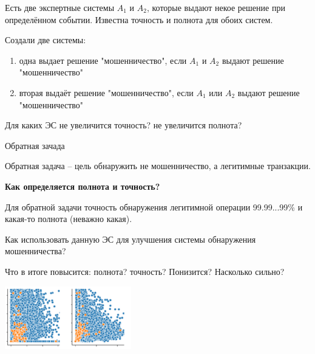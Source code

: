   
\begin{frame}
	Есть две экспертные системы $A_1$ и $A_2$, которые выдают некое решение при определённом событии. 
	Известна точность и полнота для обоих систем.
	
	Создали две системы: 
	\begin{enumerate}
		\item одна выдает решение "мошенничество", если $A_1$ и $A_2$ выдают решение "мошенничество"
		\item вторая выдаёт решение "мошенничество", если $A_1$ или $A_2$ выдают решение "мошенничество"
	\end{enumerate}
	
	Для каких ЭС не увеличится точность? не увеличится полнота?
	
\end{frame}


  
\begin{frame}{Обратная зачада}
  \small
  
  Обратная задача -- цель обнаружить не мошенничество, а легитимные транзакции.
  
  \textbf{Как определяется полнота и точность?}
  

  Для обратной задачи точность обнаружения легитимной операции 99.99...99\% и какая-то полнота (неважно какая).
  
  Как использовать данную ЭС для улучшения системы обнаружения мошенничества?
  
  Что в итоге повысится: полнота? точность? Понизится? Насколько сильно? 
  
  \begin{center}
  	\includegraphics[width=5.5cm]{../pic/kd_example_reverse_task.png}\centering
  
  \end{center}  
   
\end{frame}

